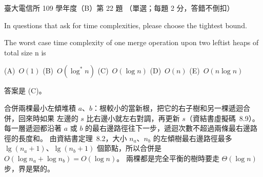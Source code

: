 \begin{pastexam}[label={px:ntu-109-comm-dsa-22}]{臺大電信所 109 學年度（B）第 22 題}
（單選；每題 2 分，答錯不倒扣）

In questions that ask for time complexities, please choose the tightest bound.

The worst case time complexity of one merge operation upon two leftist heaps of total size n is

(A)~$O(1)$ \qquad (B)~$O(\log^* n)$ \qquad (C)~$O(\log n)$ \qquad (D)~$O(n)$ \qquad (E)~$O(n\log n)$
\end{pastexam}

\begin{pastsoln}
答案是 (C)。

合併兩棵最小左傾堆積 $a$、$b$：根較小的當新根，把它的右子樹和另一棵遞迴合併，回來時如果
左邊的 $s$ 比右邊小就左右對調，再更新 $s$（資結書虛擬碼~8.9）。 每一層遞迴都沿著 $a$ 或
$b$ 的最右邊路徑往下一步，遞迴次數不超過兩條最右邊路徑的長度和。 由資結書定理~8.2，大小
$n_a$、$n_b$ 的左傾樹最右邊路徑最多 $\lg(n_a + 1)$、$\lg(n_b + 1)$ 個節點，所以合併是
$O(\log n_a + \log n_b) = O(\log n)$。 兩棵都是完全平衡的樹時要走 $\Theta(\log n)$ 步，界是緊的。
\end{pastsoln}
